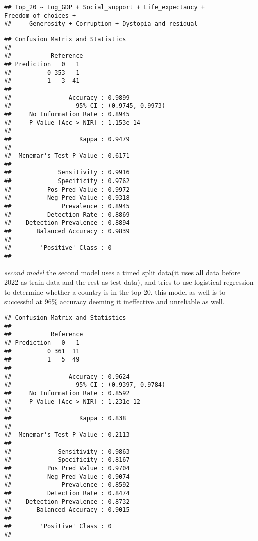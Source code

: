\documentclass[
]{article}
\begin{document}
\begin{verbatim}
## Top_20 ~ Log_GDP + Social_support + Life_expectancy + Freedom_of_choices + 
##     Generosity + Corruption + Dystopia_and_residual
\end{verbatim}

\begin{verbatim}
## Confusion Matrix and Statistics
## 
##           Reference
## Prediction   0   1
##          0 353   1
##          1   3  41
##                                           
##                Accuracy : 0.9899          
##                  95% CI : (0.9745, 0.9973)
##     No Information Rate : 0.8945          
##     P-Value [Acc > NIR] : 1.153e-14       
##                                           
##                   Kappa : 0.9479          
##                                           
##  Mcnemar's Test P-Value : 0.6171          
##                                           
##             Sensitivity : 0.9916          
##             Specificity : 0.9762          
##          Pos Pred Value : 0.9972          
##          Neg Pred Value : 0.9318          
##              Prevalence : 0.8945          
##          Detection Rate : 0.8869          
##    Detection Prevalence : 0.8894          
##       Balanced Accuracy : 0.9839          
##                                           
##        'Positive' Class : 0               
## 
\end{verbatim}

\emph{second model} the second model uses a timed split data(it uses all
data before 2022 as train data and the rest as test data), and tries to
use logistical regression to determine whether a country is in the top
20. this model as well is to successful at 96\% accuracy deeming it
ineffective and unreliable as well.

\begin{verbatim}
## Confusion Matrix and Statistics
## 
##           Reference
## Prediction   0   1
##          0 361  11
##          1   5  49
##                                           
##                Accuracy : 0.9624          
##                  95% CI : (0.9397, 0.9784)
##     No Information Rate : 0.8592          
##     P-Value [Acc > NIR] : 1.231e-12       
##                                           
##                   Kappa : 0.838           
##                                           
##  Mcnemar's Test P-Value : 0.2113          
##                                           
##             Sensitivity : 0.9863          
##             Specificity : 0.8167          
##          Pos Pred Value : 0.9704          
##          Neg Pred Value : 0.9074          
##              Prevalence : 0.8592          
##          Detection Rate : 0.8474          
##    Detection Prevalence : 0.8732          
##       Balanced Accuracy : 0.9015          
##                                           
##        'Positive' Class : 0               
## 
\end{verbatim}
\end{document}
